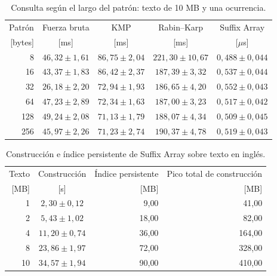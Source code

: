 \begin{table}[!ht]
    \centering
    \caption{Consulta según el largo del patrón: texto de 10 MB y una ocurrencia.}
    \label{tab:res-tiempo-patron}
    \begin{tabular}{@{}rcccc@{}}
        \toprule
        Patrón & Fuerza bruta & KMP & Rabin--Karp & Suffix Array \\
        {[bytes]} & [ms] & [ms] & [ms] & [\(\mu\)s] \\
        \midrule
        8 & \(46{,}32 \pm 1{,}61\) & \(86{,}75 \pm 2{,}04\) & \(221{,}30 \pm 10{,}67\) & \(0{,}488 \pm 0{,}044\) \\
        16 & \(43{,}37 \pm 1{,}83\) & \(86{,}42 \pm 2{,}37\) & \(187{,}39 \pm 3{,}32\) & \(0{,}537 \pm 0{,}044\) \\
        32 & \(26{,}18 \pm 2{,}20\) & \(72{,}94 \pm 1{,}93\) & \(186{,}65 \pm 4{,}20\) & \(0{,}552 \pm 0{,}043\) \\
        64 & \(47{,}23 \pm 2{,}89\) & \(72{,}34 \pm 1{,}63\) & \(187{,}00 \pm 3{,}23\) & \(0{,}517 \pm 0{,}042\) \\
        128 & \(49{,}24 \pm 2{,}08\) & \(71{,}13 \pm 1{,}79\) & \(188{,}07 \pm 4{,}34\) & \(0{,}509 \pm 0{,}045\) \\
        256 & \(45{,}97 \pm 2{,}26\) & \(71{,}23 \pm 2{,}74\) & \(190{,}37 \pm 4{,}78\) & \(0{,}519 \pm 0{,}043\) \\
        \bottomrule
    \end{tabular}
\end{table}

\begin{table}[!ht]
    \centering
    \caption{Construcción e índice persistente de Suffix Array sobre texto en inglés.}
    \label{tab:res-construccion-memoria}
    \begin{tabular}{@{}rcrr@{}}
        \toprule
        Texto & Construcción & Índice persistente & Pico total de construcción \\
        {[MB]} & [s] & [MB] & [MB] \\
        \midrule
        1 & \(2{,}30 \pm 0{,}12\) & 9{,}00 & 41{,}00 \\
        2 & \(5{,}43 \pm 1{,}02\) & 18{,}00 & 82{,}00 \\
        4 & \(11{,}20 \pm 0{,}74\) & 36{,}00 & 164{,}00 \\
        8 & \(23{,}86 \pm 1{,}97\) & 72{,}00 & 328{,}00 \\
        10 & \(34{,}57 \pm 1{,}94\) & 90{,}00 & 410{,}00 \\
        \bottomrule
    \end{tabular}
\end{table}
\endgroup

